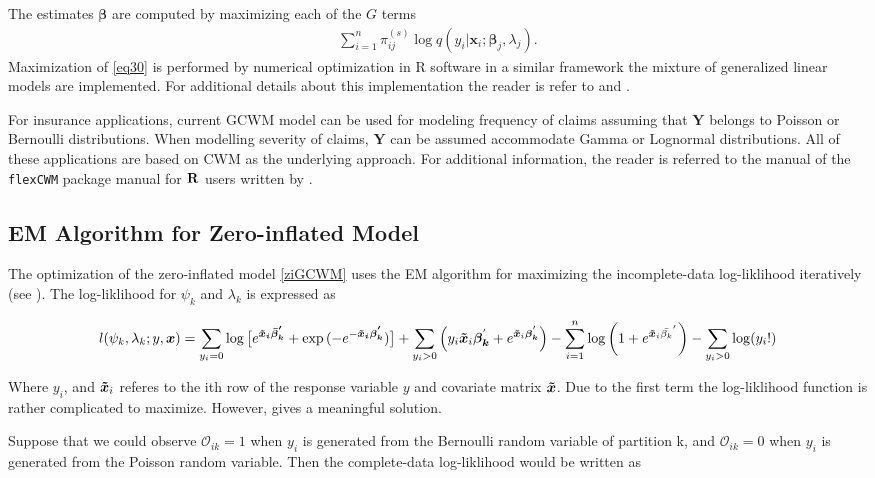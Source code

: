 \documentclass[11pt,letterpaper]{article}
\numberwithin{equation}{section}
\numberwithin{equation}{section}
\numberwithin{equation}{section}
\begin{document}
The estimates $\bm\beta$ are computed by maximizing each of the $G$ terms
\begin{align}
\sum_{i=1}^{n}\pi^{(s)}_{ij} \log{q}(y_i|\bm x_i;\bm \beta_j,\lambda_j).
\label{eq30}
\end{align}
Maximization of \eqref{eq30} is performed by numerical optimization in R software in a similar framework the mixture of generalized linear models are implemented. For additional details about this implementation the reader is refer to \cite{Wedel+DeSabro:1995} and \cite{Wedel:2002}.

For insurance applications, current GCWM model can be used for modeling frequency of claims assuming that $\bm{Y}$ belongs to Poisson or Bernoulli distributions. When modelling severity of claims, $\bm{Y}$ can be assumed accommodate Gamma or Lognormal distributions. All of these applications are based on CWM as the underlying approach. For additional information, the reader is referred to the manual of the {\tt flexCWM} package manual for ${\bf R}$ users written by \cite{Ingrassia+Punzo+Vittadini+Minotti:2015}.%
\subsection{EM Algorithm for Zero-inflated Model} 
The optimization of the zero-inflated model \eqref{ziGCWM} uses the EM algorithm for maximizing the incomplete-data log-liklihood iteratively (see \cite{Lambert}). The log-liklihood for $\psi_k$ and $\lambda_k$ is expressed as

\begin{align*}
l(\psi_k,\lambda_k; y, \bm{x}) = \sum_{y_i = 0} \log \big[ e^{ \bm{ \bm{\tilde{x}}_i \bar{\beta}_k^{'} } } + \exp{( - e^ { -\bm{ \bm{\tilde{x}}_i \beta_k^{'} }})} \big] + \sum_{y_i > 0 } \left( y_i \bm{\tilde{x}}_i \bm{\beta_k}^{'} + e^{ \bm{\tilde{x}}_i \bm{\beta_k}^{'} } \right) - \sum_{i=1}^n  \log \left(1 + e^ {\bm{\tilde{x}}_i \bar{\beta_k}^{'} } \right) - \sum_{y_i > 0} \log(y_i ! )
\end{align*}

Where $y_i$, and $\bm{\tilde{x}}_i$ referes to the ith row of the response variable $y$ and covariate matrix $\bm{\tilde{x}}$. Due to the first term the log-liklihood function is rather complicated to maximize. However, \cite{Lambert} gives a meaningful solution. 

Suppose that we could observe ${\mathcal{O}_{ik}} = 1$ when $y_i$ is generated from the Bernoulli random variable of partition k, and $\mathcal{O}_{ik} = 0$ when $y_i$ is generated from the Poisson random variable. Then the complete-data log-liklihood would be written as
\end{document}
